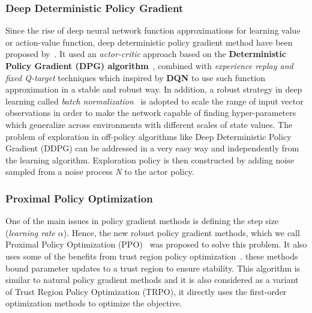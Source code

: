 \subsubsection{Deep Deterministic Policy Gradient}
Since the rise of deep neural network function approximations for learning value or action-value function, deep deterministic policy gradient method have been proposed by~\parencite{lillicrap2015continuous}. It used an \textit{actor-critic} approach based on the \textbf{Deterministic Policy Gradient (DPG) algorithm}~\parencite{silver2014deterministic}, combined with \textit{experience replay and fixed Q-target} techniques which inspired by \textbf{DQN} to use such function approximation in a stable and robust way. In addition, a robust strategy in deep learning called \textit{batch normalization}~\parencite{ioffe2015batch} is adopted to scale the range of input vector observations in order to make the network capable of finding hyper-parameters which generalize across environments with different scales of state values.
The problem of exploration in off-policy algorithms like Deep Deterministic Policy Gradient (DDPG) can be addressed in a very easy way and independently from the learning algorithm. Exploration policy is then constructed by adding noise sampled from a noise process \textit{N} to the actor policy.

\subsubsection{Proximal Policy Optimization}
One of the main issues in policy gradient methods is defining the step size (\textit{learning rate $\alpha$}). Hence, the new robust policy gradient methods, which we call Proximal Policy Optimization (PPO)~\parencite{schulman2017proximal, heess2017emergence} was proposed to solve this problem. It also uses some of the benefits from trust region policy optimization~\parencite{schulman2015trust}. these methods bound parameter updates to a trust region to ensure stability.
This algorithm is similar to natural policy gradient methods and it is also considered as a variant of Trust Region Policy Optimization (TRPO), it directly uses the first-order optimization methods to optimize the objective.


